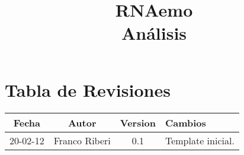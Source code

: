 \documentclass[10pt,a4paper,english,spanish]{article}
\title{\textbf{RNAemo}\\ \vspace{0.35cm} Análisis}
\begin{document}
\maketitle\pagebreak{}\tableofcontents{}\pagebreak{}

\section*{Tabla de Revisiones}
	
\begin{center}
\begin{tabular}{| c | c | c | l |}
	\hline
	{\bf Fecha} & {\bf Autor} & {\bf Version} & {\bf Cambios}\\
	\hline
	\hline		
	20-02-12 & Franco Riberi & 0.1 & Template inicial.\\\hline
\end{tabular}
\end{center}
\newpage
\end{document}

